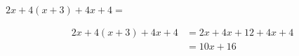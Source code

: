  $2x  + 4(x + 3) + 4x + 4 =$

\begin{solutionbox}{2.5cm}
    \begin{align*}
        2x  + 4(x + 3) + 4x + 4 & =2x+4x+12+4x+4 \\
                                & =10x+16
    \end{align*}
\end{solutionbox}
